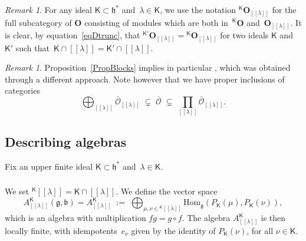 \documentclass[11pt]{amsart}
\newcommand{\lbra}{[\![}
\newcommand{\rbra}{]\!]}
\newcommand{\KKK}{\mathsf{K}}
\newcommand{\cO}{\mathcal O}
\newcommand{\bO}{\mathbf{O}}
\newcommand{\Hom}{\mathrm{Hom}}
\newcommand{\fg}{\mathfrak{g}}
\newcommand{\fh}{\mathfrak{h}}
\newcommand{\fb}{\mathfrak{b}}
\numberwithin{equation}{section}
\theoremstyle{plain}
\theoremstyle{remark}
\newtheorem{rem}[subsubsection]{Remark}
\theoremstyle{remark}
\theoremstyle{construction}
\begin{document}
\begin{rem}
For any ideal $\KKK\subset\fh^\ast$ and~$\lambda\in\KKK$, we use the notation ${}^{\KKK}\bO_{\lbra\lambda\rbra}$ for the full subcategory of $\bO$ consisting of modules which are both in~${}^{\KKK}\bO$ and~$\bO_{\lbra\lambda\rbra}$. It is clear, by equation~\eqref{eqDtrunc}, that ${}^{\KKK'}\bO_{\lbra\lambda\rbra}={}^{\KKK}\bO_{\lbra\lambda\rbra}$ for two ideals $\KKK$ and~$\KKK'$ such that~$\KKK\cap\lbra\lambda\rbra=\KKK'\cap\lbra\lambda\rbra$.
\end{rem}

\begin{rem}
Proposition~\ref{PropBlocks} implies in particular \cite[Theorem~3.4]{Nam}, which was obtained through a different approach.  Note however that we have proper inclusions of categories
$$\bigoplus_{\lbra \lambda\rbra}\bar{\cO}_{\lbra \lambda\rbra}\;\subsetneq\;\bar{\cO}\;\subsetneq\; \prod_{\lbra \lambda\rbra}\bar{\cO}_{\lbra \lambda\rbra}.$$
\end{rem}




\subsection{Describing algebras}
Fix an upper finite ideal $\KKK\subset\fh^\ast$ and~$\lambda\in \KKK$. 

\subsubsection{}\label{DefAlgA}We set ${}^{\KKK}\lbra\lambda\rbra=\KKK\cap \lbra\lambda\rbra$. We define the vector space
$$A^{\KKK}_{\lbra\lambda\rbra}(\fg,\fb)=A^{\KKK}_{\lbra\lambda\rbra}\;:=\; \bigoplus_{\mu,\nu\in {}^{\KKK}\lbra\lambda\rbra}\Hom_{\fg}(P_{\KKK}(\mu), P_{\KKK}(\nu)),$$
which is an algebra with multiplication $fg=g\circ f$. The algebra $A^{\KKK}_{\lbra\lambda\rbra}$ is then locally finite, with idempotents~$e_\nu$ given by the identity of $P_{\KKK}(\nu)$, for all $\nu\in\KKK$.
\end{document}
